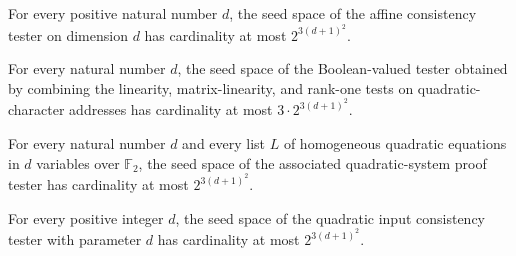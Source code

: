 \begin{theorem}
\label{FABL.affineConsistencyFunctionTester_seed_card_le}
\leanok
{}
For every positive natural number $d$, the seed space of the affine consistency tester
on dimension $d$ has cardinality at most $2^{3(d+1)^2}$.
\end{theorem}

\begin{theorem}
\label{FABL.quadraticPairProofFunctionTester_seed_card_le}
\leanok
{}
For every natural number $d$, the seed space of the Boolean-valued tester obtained by
combining the linearity, matrix-linearity, and rank-one tests on quadratic-character
addresses has cardinality at most $3\cdot 2^{3(d+1)^2}$.
\end{theorem}

\begin{theorem}
\label{FABL.quadraticSystemProofFunctionTester_seed_card_le}
\leanok
{}
For every natural number $d$ and every list $L$ of homogeneous quadratic equations in
$d$ variables over $\mathbb F_2$, the seed space of the associated quadratic-system
proof tester has cardinality at most $2^{3(d+1)^2}$.
\end{theorem}

\begin{theorem}
\label{FABL.quadraticInputConsistencyFunctionTester_seed_card_le}
\leanok
{}
For every positive integer $d$, the seed space of the quadratic input consistency tester
with parameter $d$ has cardinality at most $2^{3(d+1)^2}$.
\end{theorem}

